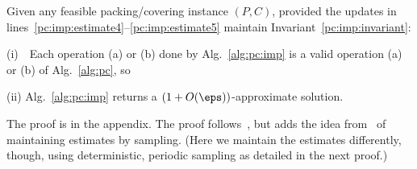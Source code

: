 \begin{lemma}\label{lemma:pc:imp:correct}
  Given any feasible packing/covering instance $(P,C)$, 
  provided the updates in lines~\ref{pc:imp:estimate4}--\ref{pc:imp:estimate5} 
  maintain Invariant~\eqref{pc:imp:invariant}:

  \noindent (i)~~Each operation (a) or (b) done by Alg.~\ref{alg:pc:imp}
  is a valid operation (a) or (b) of Alg.~\ref{alg:pc}, so

  \noindent (ii) Alg.~\ref{alg:pc:imp} returns a $(1+O(\eps))$-approximate solution.
\end{lemma}
The proof is in the appendix.
The proof follows~\cite{Young01Sequential},
but adds the idea
from~\cite{koufogiannakis2007beating,Koufogiannakis13Nearly}
of maintaining estimates by sampling.
(Here we maintain the estimates differently, though,
using deterministic, periodic sampling
as detailed in the next proof.)

